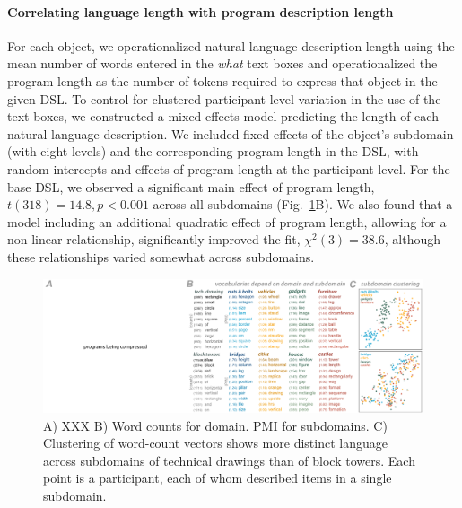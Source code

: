 \documentclass[10pt,letterpaper]{article}
\begin{document}
\paragraph{Correlating language length with program description length}
For each object, we operationalized natural-language description length using the mean number of words entered in the \textit{what} text boxes and operationalized the program length as the number of tokens required to express that object in the given DSL.
To control for clustered participant-level variation in the use of the text boxes, we constructed a mixed-effects model predicting the length of each natural-language description. 
We included fixed effects of the object's subdomain (with eight levels) and the corresponding program length in the DSL, with random intercepts and effects of program length at the participant-level. 
For the base DSL, we observed a significant main effect of program length, $t(318)=14.8, p < 0.001$ across all subdomains (Fig.~\ref{fig:libraries_correlations}B).
We also found that a model including an additional quadratic effect of program length, allowing for a non-linear relationship, significantly improved the fit, $\chi^2(3)=38.6$, although these relationships varied somewhat across subdomains.

\begin{figure}
  \begin{center}
  \includegraphics[width=0.98\linewidth]{figures/lax_vocabularies.pdf}
  \caption{A) XXX B) Word counts for domain. PMI for subdomains. C) Clustering of word-count vectors shows more distinct language across subdomains of technical drawings than of block towers. Each point is a participant, each of whom described items in a single subdomain. }
  \label{fig:libraries_correlations}
  \end{center}
  \end{figure}
\end{document}
